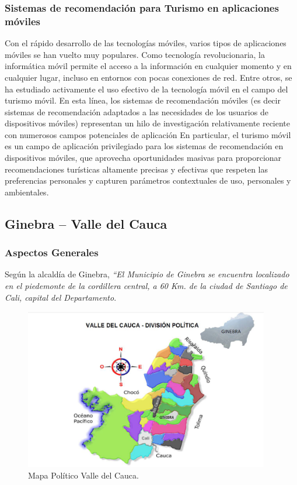 \documentclass[12pt,letterpaper,openany]{book}
\begin{document}
\subsubsection{Sistemas de recomendación para Turismo en aplicaciones móviles}
Con el rápido desarrollo de las tecnologías móviles, varios tipos de aplicaciones móviles se han vuelto muy populares. Como tecnología revolucionaria, la informática móvil permite el acceso a la información en cualquier momento y en cualquier lugar, incluso en entornos con pocas conexiones de red. Entre otros, se ha estudiado activamente el uso efectivo de la tecnología móvil en el campo del turismo móvil. En esta línea, los sistemas de recomendación móviles (es decir sistemas de recomendación adaptados a las necesidades de los usuarios de dispositivos móviles) representan un hilo de investigación relativamente reciente con numerosos campos potenciales de aplicación  En particular, el turismo móvil es un campo de aplicación privilegiado para los sistemas de recomendación en dispositivos móviles, que aprovecha oportunidades masivas para proporcionar recomendaciones turísticas altamente precisas y efectivas que respeten las preferencias personales y capturen parámetros contextuales de uso, personales y ambientales\cite{16}. 

\subsection{Ginebra – Valle del Cauca}
\subsubsection{Aspectos Generales}
Según la alcaldía de Ginebra, \textit{“El Municipio de Ginebra se encuentra localizado en el piedemonte de la cordillera central, a 60 Km. de la ciudad de Santiago de Cali, capital del Departamento}.

\begin{figure}[H]
\begin{center}
\includegraphics[width=10.7cm]{./imagenes/mapa_politico}
\caption{Mapa Político Valle del Cauca.}
\end{center}
\end{figure}
\end{document}

